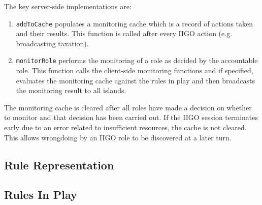 The key server-side implementations are:
\begin{enumerate}
    \item \texttt{addToCache} populates a monitoring cache which is a record of actions taken and their results. This function is called after every IIGO action (e.g. broadcasting taxation).
    \item \texttt{monitorRole} performs the monitoring of a role as decided by the accountable role. This function calls the client-side monitoring functions and if specified, evaluates the monitoring cache against the rules in play and then broadcasts the monitoring result to all islands.
\end{enumerate}

The monitoring cache is cleared after all roles have made a decision on whether to monitor and that decision has been carried out. If the IIGO session terminates early due to an error related to insufficient resources, the cache is not cleared. This allows wrongdoing by an IIGO role to be discovered at a later turn.

\subsection{Rule Representation}
\subsection{Rules In Play}
